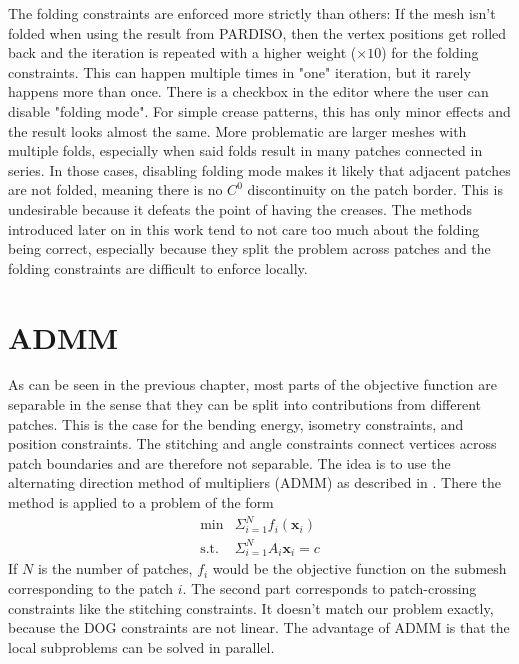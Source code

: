 \documentclass[a4paper,twoside,12pt,nochapterprefix]{scrbook}
\begin{document}
The folding constraints are enforced more strictly than others: If the mesh isn't folded when using the result from PARDISO, then the vertex positions get rolled back and the iteration is repeated with a higher weight ($\times 10$) for the folding constraints. This can happen multiple times in "one" iteration, but it rarely happens more than once.\newline
There is a checkbox in the editor where the user can disable "folding mode". For simple crease patterns, this has only minor effects and the result looks almost the same. More problematic are larger meshes with multiple folds, especially when said folds result in many patches connected in series. In those cases, disabling folding mode makes it likely that adjacent patches are not folded, meaning there is no $C^0$ discontinuity on the patch border. This is undesirable because it defeats the point of having the creases.\newline
The methods introduced later on in this work tend to not care too much about the folding being correct, especially because they split the problem across patches and the folding constraints are difficult to enforce locally.\newline
\chapter{ADMM}\label{sec:admm}
As can be seen in the previous chapter, most parts of the objective function are separable in the sense that they can be split into contributions from different patches. This is the case for the bending energy, isometry constraints, and position constraints. The stitching and angle constraints connect vertices across patch boundaries and are therefore not separable.\newline
The idea is to use the alternating direction method of multipliers (ADMM) as described in \cite{Deng2017ParallelMA}. There the method is applied to a problem of the form
\begin{equation}
\begin{array}{lr}
\mbox{min} & \Sigma_{i=1}^{N} f_i(\mathbf{x}_i) \\
\mbox{s.t.} & \Sigma_{i=1}^{N} A_i \mathbf{x}_i = c
\end{array}
\end{equation}
If $N$ is the number of patches, $f_i$ would be the objective function on the submesh corresponding to the patch $i$. The second part corresponds to patch-crossing constraints like the stitching constraints. It doesn't match our problem exactly, because the DOG constraints are not linear. The advantage of ADMM is that the local subproblems can be solved in parallel.\newline
\end{document}
